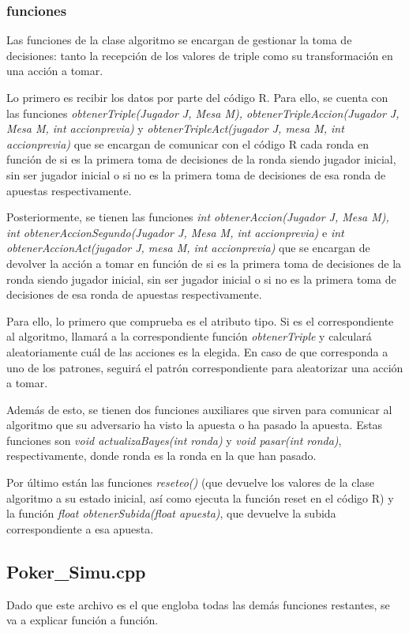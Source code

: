 \subsubsection{funciones}

Las funciones de la clase algoritmo se encargan de gestionar la toma de decisiones: tanto la recepción de los valores de triple como su transformación en una acción a tomar.

Lo primero es recibir los datos por parte del código R. Para ello, se cuenta con las funciones \textit{obtenerTriple(Jugador J, Mesa M), obtenerTripleAccion(Jugador J, Mesa M, int accionprevia)} y \textit{obtenerTripleAct(jugador J, mesa M, int accionprevia)} que se encargan de comunicar con el código R cada ronda en función de si es la primera toma de decisiones de la ronda siendo jugador inicial, sin ser jugador inicial o si no es la primera toma de decisiones de esa ronda de apuestas respectivamente.

Posteriormente, se tienen las funciones \textit{int obtenerAccion(Jugador J, Mesa M), int obtenerAccionSegundo(Jugador J, Mesa M, int accionprevia)} e  \textit{int obtenerAccionAct(jugador J, mesa M, int accionprevia) }que se encargan de devolver la acción a tomar en función de si es la primera toma de decisiones de la ronda siendo jugador inicial, sin ser jugador inicial o si no es la primera toma de decisiones de esa ronda de apuestas respectivamente.

Para ello, lo primero que comprueba es el atributo tipo. Si es el correspondiente al algoritmo, llamará a la correspondiente función \textit{obtenerTriple} y calculará aleatoriamente cuál de las acciones es la elegida. En caso de que corresponda a uno de los patrones, seguirá el patrón correspondiente para aleatorizar una acción a tomar.

Además de esto, se tienen dos funciones auxiliares que sirven para comunicar al algoritmo que su adversario ha visto la apuesta o ha pasado la apuesta. Estas funciones son \textit{void actualizaBayes(int ronda)} y \textit{void pasar(int ronda)}, respectivamente, donde ronda es la ronda en la que han pasado.

Por último están las funciones \textit{reseteo() }(que devuelve los valores de la clase algoritmo a su estado inicial, así como ejecuta la función reset en el código R) y la función\textit{ float obtenerSubida(float apuesta)}, que devuelve la subida correspondiente a esa apuesta.

\subsection{Poker\_Simu.cpp}
\label{sec:pokersimu}
Dado que este archivo es el que engloba todas las demás funciones restantes, se va a explicar función a función.

